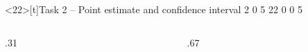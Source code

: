 \documentclass[12pt,aspectratio=169]{beamer}
\newif\ifReference
\begin{document}
\begin{frame}<22>[t]{Task 2 -- Point estimate and confidence interval}
\Referencetrue
\expandafter\def\csname Input5\endcsname{2}
\expandafter\def\csname Input6\endcsname{0}
\expandafter\def\csname Input7\endcsname{5}
\expandafter\def\csname Input9\endcsname{22}
\expandafter\def\csname Input11\endcsname{0}
\expandafter\def\csname Input13\endcsname{0}
\expandafter\def\csname Input15\endcsname{5}
\vspace{-7mm}
\begin{columns}[T,onlytextwidth]
\begin{column}{.31\textwidth}\TaskTwoReference\end{column}
\begin{column}{.67\textwidth}\TaskTwoWorkingTable\end{column}
\end{columns}
\end{frame}
\end{document}

